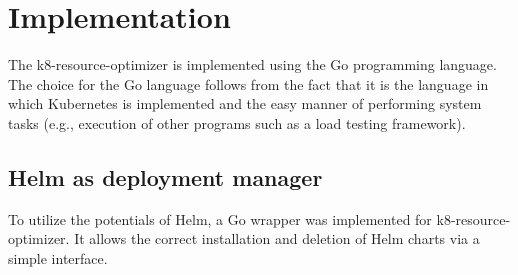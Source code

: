 \section{Implementation}
The k8-resource-optimizer is implemented using the Go programming language. The choice for the Go language follows from the fact that it is the language in which Kubernetes is implemented and the easy manner of performing system tasks (e.g., execution of other programs such as a load testing framework).
\subsection{Helm as deployment manager}
To utilize the potentials of Helm, a Go wrapper was implemented for k8-resource-optimizer. It allows the correct installation and deletion of Helm charts via a simple interface.

